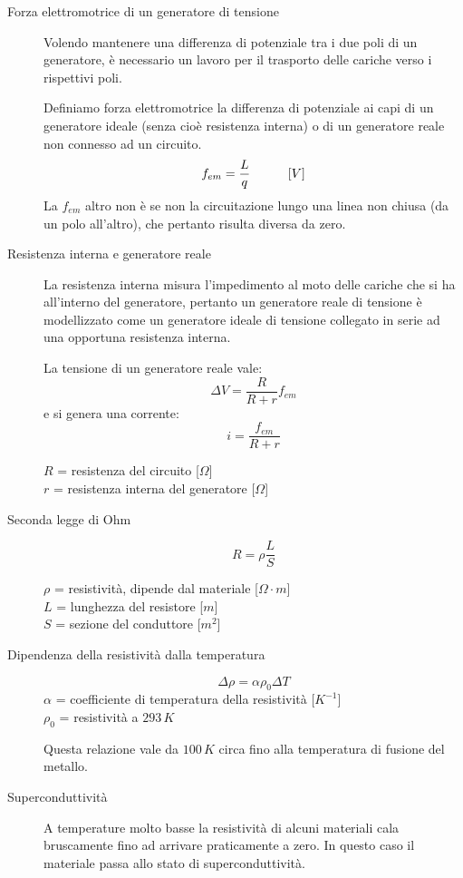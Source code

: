 \documentclass[a4paper,11pt,italian]{article}
\begin{document}
\begin{description}
  \item[Forza elettromotrice di un generatore di tensione] 
  Volendo mantenere una differenza di potenziale tra i due poli di un generatore, è necessario un lavoro per il trasporto delle cariche verso i rispettivi poli.
  
  Definiamo forza elettromotrice la differenza di potenziale ai capi di un generatore ideale (senza cioè resistenza interna) o di un generatore reale non connesso ad un circuito.
  \[ f_{em} = \frac{L}{q} \hspace*{3em} [V] \]
  La $ f_{em} $ altro non è se non la circuitazione lungo una linea non chiusa (da un polo all'altro), che pertanto risulta diversa da zero.
  
  \item[Resistenza interna e generatore reale] 
  La resistenza interna misura l’impedimento al moto delle cariche che si ha all’interno del generatore, pertanto un generatore reale di tensione è modellizzato come un generatore ideale di tensione collegato in serie ad una opportuna resistenza interna.
  
  La tensione di un generatore reale vale:
  \[ \Delta V = \frac{R}{R+r} f_{em} \]
  e si genera una corrente:
  \[ i = \frac{f_{em}}{R+r} \]
  \begin{multicols}{2}
  $ R $ = resistenza del circuito [$ \Omega $]\\
  $ r $ = resistenza interna del generatore [$ \Omega $]
  \end{multicols}
  
  \item[Seconda legge di Ohm] 
  \[ R = \rho \frac{L}{S} \]
  \begin{multicols}{2}
  $ \rho $ = resistività, dipende dal materiale [$ \Omega \cdot m $]\\
  $ L $ = lunghezza del resistore [$ m $]\\
  $ S $ = sezione del conduttore [$ m^2 $]
  \end{multicols}
  
  \item[Dipendenza della resistività dalla temperatura]
  \[ \Delta \rho = \alpha \rho_0 \Delta T  \]
  $ \alpha $ = coefficiente di temperatura della resistività [$ K^{-1} $]\\
  $ \rho_0 $ = resistività a $ 293 \, K $
  
  Questa relazione vale da $ 100 \, K $ circa fino alla temperatura di fusione del metallo.
  
  \item[Superconduttività] 
  A temperature molto basse la resistività di alcuni materiali cala bruscamente fino ad arrivare praticamente a zero.
  In questo caso il materiale passa allo stato di superconduttività.
  

\end{description}
\end{document}
